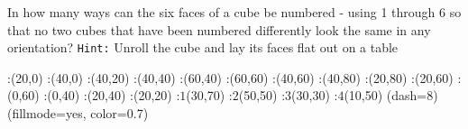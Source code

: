 


\question[6] In how many ways can the six faces of a cube be numbered - using 1 through 6 
so that no two cubes that have been numbered differently look the same in any orientation?
\texttt{Hint:} Unroll the cube and lay its faces flat out on a table


\ifprintanswers
  \begin{marginfigure}
      :(20,0)
      :(40,0)
      :(40,20)
      :(40,40)
      :(60,40)
      :(60,60)
      :(40,60)
      :(40,80)
      :(20,80) 
      :(20,60)
      :(0,60)
      :(0,40)
      :(20,40)
      :(20,20)
      :$1$(30,70)
      :$2$(50,50)
      :$3$(30,30)
      :$4$(10,50)
    \figdrawbegin{}
      \figdrawline[100,101,102,103,104,105,106,107,108,109,110,111,112,113,100]
      \figset (dash=8)
      \figdrawline[103,106,109,112,103]
      \figset (fillmode=yes, color=0.7)
      \figdrawline[100,101,102,113,100]
    \figdrawend
    \centerline{\box\figBoxA}
  \end{marginfigure}
  
\fi 

